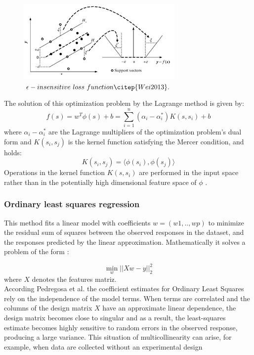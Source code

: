 \documentclass[review]{elsarticle}
\begin{document}
\begin{figure}[h] 
 \centering
 \includegraphics[scale=.9]{SVR}
 \caption{$\epsilon -insensitive \ loss \ function \citep{Wei2013}.$} 
 \label{figura2} 
\end{figure}
 
The solution of this optimization problem by the Lagrange method is given by:\\
$$ f(s) = w^T \phi (s) + b = \sum_{i=1}^{n} (\alpha_i - \alpha_i^*) K (s,s_i) + b $$ 
where $\alpha_i - \alpha_i^*$  are the Lagrange multipliers of the optimization problem’s dual form and $K(s_i,s_j )$ is the kernel function satisfying the Mercer condition, and holds:
$$K(s_i,s_j ) = \big \langle  \phi(s_i) , \phi(s_j)  \big \rangle $$
Operations in the kernel function $K(s,s_i )$ are performed in the input space rather than in the potentially high dimensional feature space of $\phi$ \citep{Alonso2013}.

\subsubsection{Ordinary least squares regression}
This method fits a linear model with coefficients $w = (w1,..,wp)$ to minimize the residual sum of squares between the observed responses in the dataset, and the responses predicted by the linear approximation. Mathematically it solves a problem of the form \citep{ scikit-learn2011}:

$$\min_{w} \Bigr| \Bigr| Xw - y \Bigr| \Bigr|_2^2  $$
where $X$ denotes the features matriz. \\
According Pedregosa et al. \citep{ scikitlearn2011}  the coefficient estimates for Ordinary Least Squares rely on the independence of the model terms. When terms are correlated and the columns of the design matrix $X$ have an approximate linear dependence, the design matrix becomes close to singular and as a result, the least-squares estimate becomes highly sensitive to random errors in the observed response, producing a large variance. This situation of multicollinearity can arise, for example, when data are collected without an experimental design
\end{document}
